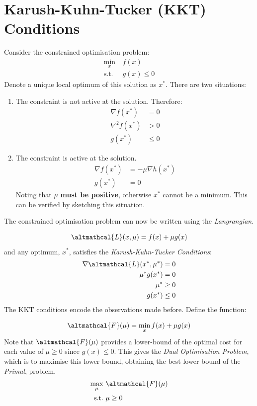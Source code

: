 \documentclass[a4paper]{book}
\newcommand{\ix}[1]{%
  \leavevmode %
  \marginpar{\small\emph{#1}}%
}
\begin{document}
	\section{Karush-Kuhn-Tucker (KKT) Conditions}
	Consider the constrained optimisation problem:
	\begin{align}
	\min_{x}&\ f(x) \nonumber \\
	\text{s.t.}&\ g(x) \leq 0 
	\end{align}
	Denote a unique local optimum of this solution as $x^*$. There are two situations:
	\begin{enumerate}
		\item The constraint is not active at the solution. Therefore:
		\begin{align*}
		\nabla f(x^*) &= 0 \\
		\nabla^2 f(x^*) &> 0 \\
		g(x^*) &\leq 0
		\end{align*}
		
		\item The constraint is active at the solution.
		\begin{align*}
			\nabla f(x^*) &= -\mu \nabla h(x^*) \\
			g(x^*) &= 0
		\end{align*}
		Noting that $\mu$ \textbf{must be positive}, otherwise $x^*$ cannot be a minimum. This can be verified by sketching this situation.
	\end{enumerate}
	The constrained optimisation problem can now be written using the \emph{Langrangian}.\ix{Langrangian}
	\begin{align}
	\altmathcal{L}(x, \mu) = f(x) + \mu g(x)
	\end{align}
	and any optimum, $x^*$, satisfies the \emph{Karush-Kuhn-Tucker Conditions}:
	\begin{align}
		\nabla \altmathcal{L}(x^*, \mu^*) &= 0 \\
		\mu^* g(x^*) &= 0 \\
		\mu^* &\geq 0  \\
		g(x^*)& \leq 0
	\end{align}
	The KKT conditions encode the observations made before. Define the function:\ix{Duality}
	\begin{align}
	\altmathcal{F}(\mu) = \min_x f(x) + \mu g(x)
	\end{align}
	Note that $\altmathcal{F}(\mu)$ provides a lower-bound of the optimal cost for each value of $\mu \geq 0$ since $g(x) \leq 0$. This gives the \emph{Dual Optimisation Problem}, which is to maximise this lower bound, obtaining the best lower bound of the \emph{Primal}, problem.
	\begin{align}
		\max_{\mu}&\ \altmathcal{F}(\mu) \nonumber \\
		\text{s.t.}&\ \mu \geq 0 
	\end{align}
	
\end{document}

